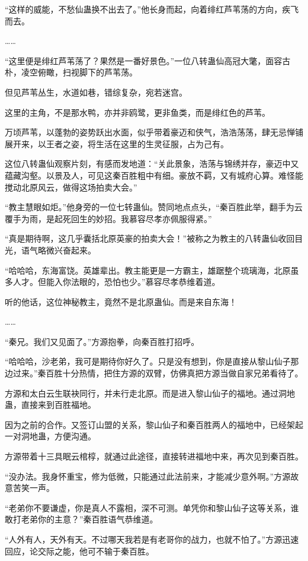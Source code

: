 \begin{this_body}
“这样的威能，不愁仙蛊换不出去了。”他长身而起，向着绯红芦苇荡的方向，疾飞而去。

……

“这里便是绯红芦苇荡了？果然是一番好景色。”一位八转蛊仙高冠大氅，面容古朴，凌空俯瞰，扫视脚下的芦苇荡。

但见芦苇丛生，水道如巷，错综复杂，宛若迷宫。

这里的主角，不是那水鸭，亦并非鸥鹭，更非鱼类，而是绯红色的芦苇。

万顷芦苇，以蓬勃的姿势跃出水面，似乎带着豪迈和侠气，浩浩荡荡，肆无忌惮铺展开来，以王者之姿，将生活在这里的生灵征服，占为己有。

这位八转蛊仙观察片刻，有感而发地道：“关此景象，浩荡与锦绣并存，豪迈中又蕴藏沟壑。以景及人，可见这秦百胜粗中有细。豪放不羁，又有城府心算。难怪能搅动北原风云，做得这场拍卖大会。”

“教主慧眼如炬。”他身旁的一位七转蛊仙。赞同地点点头，“秦百胜此举，翻手为云覆手为雨，是起死回生的妙招。我慕容尽孝亦佩服得紧。”

“真是期待啊，这几乎囊括北原英豪的拍卖大会！”被称之为教主的八转蛊仙收回目光，语气略微兴奋起来。

“哈哈哈，东海富饶。英雄辈出。教主能更是一方霸主，雄踞整个琉璃海，北原虽多人才。但能入你法眼的，恐怕也少。”慕容尽孝恭维着道。

听的他话，这位神秘教主，竟然不是北原蛊仙。而是来自东海！

……

“秦兄。我们又见面了。”方源抱拳，向秦百胜打招呼。

“哈哈哈，沙老弟，我可是期待你好久了。只是没有想到，你是直接从黎山仙子那边过来。”秦百胜十分热情，把住方源的双臂，仿佛真把方源当做自家兄弟看待了。

方源和太白云生联袂同行，并未行走北原。而是进入黎山仙子的福地。通过洞地蛊，直接来到百胜福地。

因为之前的合作。又签订山盟的关系，黎山仙子和秦百胜两人的福地中，已经架起一对洞地蛊，方便沟通。

方源带着十三具眠云棺椁，就通过此途径，直接转进福地中来，再次见到秦百胜。

“没办法。我身怀重宝，修为低微，只能通过此法前来，才能减少意外啊。”方源故意苦笑一声。

“老弟你不要谦虚，你是真人不露相，深不可测。单凭你和黎山仙子这等关系，谁敢打老弟你的主意？”秦百胜语气恭维道。

“人外有人，天外有天。不过哪天我若是有老哥你的战力，也就不怕了。”方源迅速回应，论交际之能，他可不输于秦百胜。


\end{this_body}
